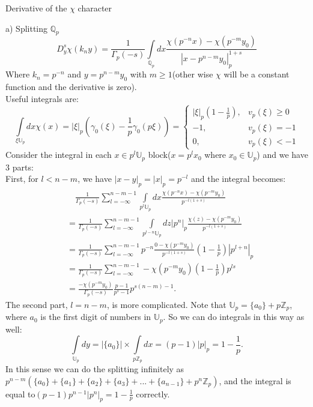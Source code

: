 \documentclass[12pt]{article}
\begin{document}
\begin{section}{Derivative of the $\chi$ character}
\begin{paragraph}{a) Splitting $\mathbb{Q}_p$}
\begin{equation}
D^s_y \chi(k_n y)=\frac{1}{\Gamma_p (-s)} \int\limits _{\mathbb{Q}_p}dx \frac{\chi( p^{-n} x) - \chi( p^{-m}y_0)}{|x-p^{n-m}y_0|_p^{1+s}}
\end{equation}
Where $k_n=p^{-n}$ and $y=p^{n-m} y_0$ with $m\geq 1$(other wise $\chi$ will be a constant function and the derivative is zero).\\
Useful integrals are:
\begin{equation}
\int\limits_{\xi \mathbb{U}_p}dx\chi(x)=|\xi|_p(\gamma_0(\xi)-\frac{1}{p}\gamma_0(p\xi))
=\begin{cases}
|\xi|_p(1-\frac{1}{p}), &v_p(\xi)\geq 0\\
-1,  &v_p(\xi) = -1\\
0,  &v_p(\xi)< -1
\end{cases}
\end{equation}
Consider the integral in each $x\in p^l \mathbb{U}_p$ block($x=p^l x_0$ where $x_0\in \mathbb{U}_p$) and we have 3 parts:\\
First, for $l<n-m$, we have $|x-y|_p=|x|_p=p^{-l}$ and the integral becomes:
\begin{equation}
\begin{split}
&\quad\frac{1}{\Gamma_p(-s)}\sum_{l=-\infty}^{n-m-1} \int\limits _{p^l \mathbb{U}_p}dx \frac{\chi( p^{-n} x) - \chi( p^{-m}y_0)}{p^{-l(1+s)}}\\
&= \frac{1}{\Gamma_p(-s)}\sum_{l=-\infty}^{n-m-1} \int\limits _{p^{l-n} \mathbb{U}_p}dz |p^n|_p \frac{\chi(z) - \chi( p^{-m}y_0)}{p^{-l(1+s)}} \\
&= \frac{1}{\Gamma_p(-s)}\sum_{l=-\infty}^{n-m-1} p^{-n} \frac{0 - \chi( p^{-m}y_0)}{p^{-l(1+s)}} (1-\frac{1}{p}) |p^{l+n}|_p \\
&= \frac{1}{\Gamma_p(-s)}\sum_{l=-\infty}^{n-m-1} - \chi( p^{-m}y_0)(1-\frac{1}{p})p^{ls}\\
&= \frac{- \chi( p^{-m}y_0)}{\Gamma_p(-s)} \frac{p-1}{p^s-1} p^{s(n-m)-1}.
\end{split}
\end{equation}
The second part, $l=n-m$, is more complicated. Note that $\mathbb{U}_p=\{a_0\}+p\mathbb{Z}_p$, where $a_0$ is the first digit of numbers in $\mathbb{U}_p$. So we can do integrals in this way as well: 
\begin{equation}
\int\limits_{\mathbb{U}_p}dy=|\{a_0\}|\times\int\limits_{p\mathbb{Z}_p}dx=(p-1)|p|_p=1-\frac{1}{p}.
\end{equation} 
In this sense we can do the splitting infinitely as $p^{n-m}(\{a_0\}+\{a_1\}+\{a_2\}+\{a_3\}+...+\{a_{n-1}\}+p^n\mathbb{Z}_p)$, and the integral is equal to$(p-1)p^{n-1}|p^n|_p=1-\frac{1}{p}$ correctly. \\

\end{paragraph}
\end{section}
\end{document}

